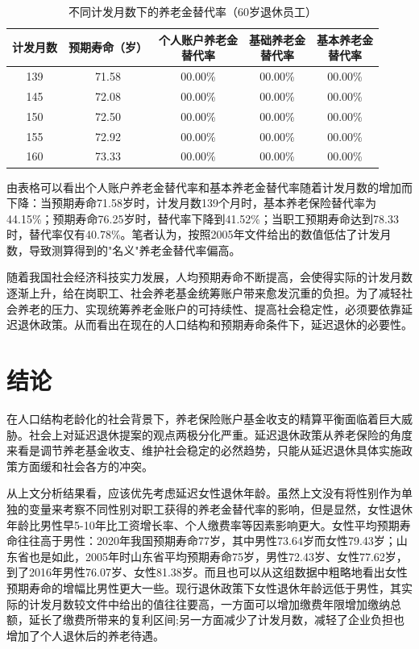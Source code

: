 \documentclass[a4paper,12pt]{ctexart}
\newcommand{\wuhao}{\fontsize{10.5pt}{15.75pt}\selectfont}
\numberwithin{equation}{section}
\begin{document}
\begin{spacing}{1.5}
\vspace{0.3cm}
\begin{table}[htbp]
\centering
\caption{不同计发月数下的养老金替代率（60岁退休员工）}
\wuhao
\begin{tabular}{ccccc}
\toprule
计发月数 & 预期寿命（岁） & \makecell{个人账户养老金\\替代率} & \makecell{基础养老金\\替代率} & \makecell{基本养老金\\替代率} \\
\midrule
139 & 71.58 & 00.00\% & 00.00\% & 00.00\% \\
145 & 72.08 & 00.00\% & 00.00\% & 00.00\% \\
150 & 72.50 & 00.00\% & 00.00\% & 00.00\% \\
155 & 72.92 & 00.00\% & 00.00\% & 00.00\% \\
160 & 73.33 & 00.00\% & 00.00\% & 00.00\% \\
\bottomrule
\end{tabular}
\end{table}

由表格可以看出个人账户养老金替代率和基本养老金替代率随着计发月数的增加而下降：当预期寿命71.58岁时，计发月数139个月时，基本养老保险替代率为44.15\%；预期寿命76.25岁时，替代率下降到41.52\%；当职工预期寿命达到78.33时，替代率仅有40.78\%。笔者认为，按照2005年文件给出的数值低估了计发月数，导致测算得到的"名义"养老金替代率偏高。

随着我国社会经济科技实力发展，人均预期寿命不断提高，会使得实际的计发月数逐渐上升，给在岗职工、社会养老基金统筹账户带来愈发沉重的负担。为了减轻社会养老的压力、实现统筹养老金账户的可持续性、提高社会稳定性，必须要依靠延迟退休政策。从而看出在现在的人口结构和预期寿命条件下，延迟退休的必要性。

\section{结论}

在人口结构老龄化的社会背景下，养老保险账户基金收支的精算平衡面临着巨大威胁。社会上对延迟退休提案的观点两极分化严重。延迟退休政策从养老保险的角度来看是调节养老基金收支、维护社会稳定的必然趋势，只能从延迟退休具体实施政策方面缓和社会各方的冲突。

从上文分析结果看，应该优先考虑延迟女性退休年龄。虽然上文没有将性别作为单独的变量来考察不同性别对职工获得的养老金替代率的影响，但是显然，女性退休年龄比男性早5-10年比工资增长率、个人缴费率等因素影响更大。女性平均预期寿命往往高于男性：2020年我国预期寿命77岁，其中男性73.64岁而女性79.43岁；山东省也是如此，2005年时山东省平均预期寿命75岁，男性72.43岁、女性77.62岁，到了2016年男性76.07岁、女性81.38岁。而且也可以从这组数据中粗略地看出女性预期寿命的增幅比男性更大一些。现行退休政策下女性退休年龄远低于男性，其实际的计发月数较文件中给出的值往往要高，一方面可以增加缴费年限增加缴纳总额，延长了缴费所带来的复利区间;另一方面减少了计发月数，减轻了企业负担也增加了个人退休后的养老待遇。

\end{spacing}
\end{document}
